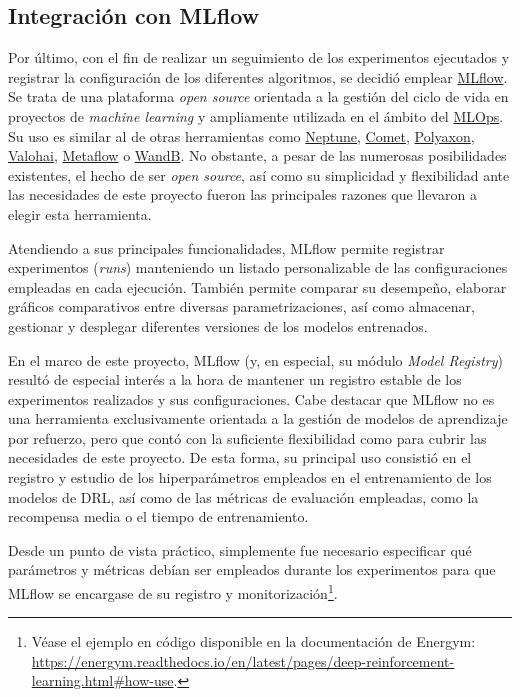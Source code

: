 \subsection{Integración con MLflow}

Por último, con el fin de realizar un seguimiento de los experimentos ejecutados y registrar la configuración de los diferentes algoritmos, se decidió emplear \href{https://mlflow.org/}{MLflow}. Se trata de una plataforma \textit{open source} orientada a la gestión del ciclo de vida en proyectos de \textit{machine learning} y ampliamente utilizada en el ámbito del \href{https://ml-ops.org/}{MLOps}. Su uso es similar al de otras herramientas como \href{https://neptune.ai/}{Neptune}, \href{https://www.comet.ml}{Comet}, \href{https://polyaxon.com/}{Polyaxon}, \href{https://valohai.com/}{Valohai}, \href{https://metaflow.org/}{Metaflow} o \href{https://wandb.ai/site}{WandB}. No obstante, a pesar de las numerosas posibilidades existentes, el hecho de ser \textit{open source}, así como su simplicidad y flexibilidad ante las necesidades de este proyecto fueron las principales razones que llevaron a elegir esta herramienta.

Atendiendo a sus principales funcionalidades, MLflow permite registrar experimentos (\textit{runs}) manteniendo un listado personalizable de las configuraciones empleadas en cada ejecución. También permite comparar su desempeño, elaborar gráficos comparativos entre diversas parametrizaciones, así como almacenar, gestionar y desplegar diferentes versiones de los modelos entrenados.

En el marco de este proyecto, MLflow (y, en especial, su módulo \textit{Model Registry}) resultó de especial interés a la hora de mantener un registro estable de los experimentos realizados y sus configuraciones. Cabe destacar que MLflow no es una herramienta exclusivamente orientada a la gestión de modelos de aprendizaje por refuerzo, pero que contó con la suficiente flexibilidad como para cubrir las necesidades de este proyecto. De esta forma, su principal uso consistió en el registro y estudio de los hiperparámetros empleados en el entrenamiento de los modelos de DRL, así como de las métricas de evaluación empleadas, como la recompensa media o el tiempo de entrenamiento.

Desde un punto de vista práctico, simplemente fue necesario especificar qué parámetros y métricas debían ser empleados durante los experimentos para que MLflow se encargase de su registro y monitorización\footnote{Véase el ejemplo en código disponible en la documentación de Energym: \url{https://energym.readthedocs.io/en/latest/pages/deep-reinforcement-learning.html\#how-use}.}.

